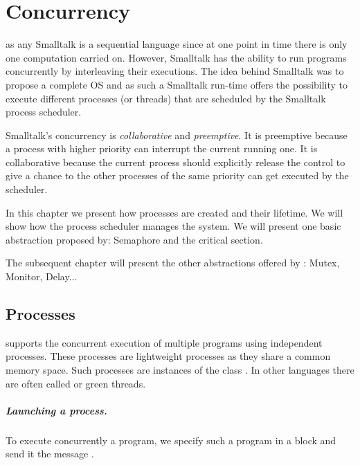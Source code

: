 \documentclass[a4paper,10pt,twoside]{book}
\begin{document}
\fi
\sloppy
\chapter{Concurrency}\label{cha:basic}

\pharo as any Smalltalk is a sequential language since at one point in time there is only 
one computation carried on. However, Smalltalk has the ability to run programs concurrently by interleaving their executions. The idea behind Smalltalk was to propose a complete OS and as such a Smalltalk run-time offers the possibility to execute different processes (or threads) that are scheduled by the Smalltalk process scheduler. 

Smalltalk's concurrency is \emph{collaborative} and \emph{preemptive}. It is preemptive because a process with higher priority can interrupt the current running one. It is collaborative because the current process should explicitly release the control to give a chance to the other processes of the same priority can get executed by the scheduler. 

In this chapter we present how processes are created and their lifetime. We will show how the process scheduler manages the system. We will present one basic abstraction proposed by:  Semaphore and the critical section. 

The subsequent chapter will present the other abstractions offered by \pharo: Mutex, Monitor, Delay...


\section{Processes}
\pharo supports the concurrent execution of multiple programs using independent processes. These processes are lightweight processes as they share a common memory space. Such processes are instances of the class . In other languages there are often called  or green threads.

\paragraph{Launching a process. }
To execute concurrently a program, we specify such a program in a block and send it the message .
\end{document}

